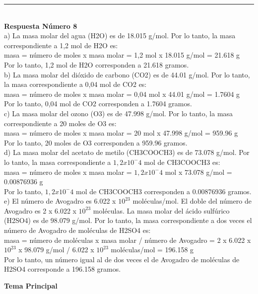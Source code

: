 \documentclass{article}
\begin{document}
\noindent\rule{\textwidth}{1pt} \\
\textbf{Respuesta Número 8} \\
a) La masa molar del agua (H2O) es de 18.015 g/mol. Por lo tanto, la masa correspondiente a 1,2 mol de H2O es:\\
masa = número de moles x masa molar = 1,2 mol x 18.015 g/mol = 21.618 g\\
Por lo tanto, 1,2 mol de H2O corresponden a 21.618 gramos.\\
b) La masa molar del dióxido de carbono (CO2) es de 44.01 g/mol. Por lo tanto, la masa correspondiente a 0,04 mol de CO2 es:\\
masa = número de moles x masa molar = 0,04 mol x 44.01 g/mol = 1.7604 g\\
Por lo tanto, 0,04 mol de CO2 corresponden a 1.7604 gramos.\\
c) La masa molar del ozono (O3) es de 47.998 g/mol. Por lo tanto, la masa correspondiente a 20 moles de O3 es:\\
masa = número de moles x masa molar = 20 mol x 47.998 g/mol = 959.96 g\\
Por lo tanto, 20 moles de O3 corresponden a 959.96 gramos.\\
d) La masa molar del acetato de metilo (CH3COOCH3) es de 73.078 g/mol. Por lo tanto, la masa correspondiente a $1,2x10^-4$ mol de CH3COOCH3 es:\\
masa = número de moles x masa molar = $1,2x10^-4$ mol x 73.078 g/mol = 0.00876936 g\\
Por lo tanto, $1,2x10^-4$ mol de CH3COOCH3 corresponden a 0.00876936 gramos.\\
e) El número de Avogadro es 6.022 x $10^23$ moléculas/mol. El doble del número de Avogadro es 2 x 6.022 x $10^23$ moléculas. La masa molar del ácido sulfúrico (H2SO4) es de 98.079 g/mol. Por lo tanto, la masa correspondiente a dos veces el número de Avogadro de moléculas de H2SO4 es:\\
masa = número de moléculas x masa molar / número de Avogadro = 2 x 6.022 x $10^23$ x 98.079 g/mol / 6.022 x $10^23$ moléculas/mol = 196.158 g\\
Por lo tanto, un número igual al de dos veces el de Avogadro de moléculas de H2SO4 corresponde a 196.158 gramos.\\



\begin{center}
{\Huge \Large \textbf{Tema Principal}} \\
\end{center}
\end{document}
